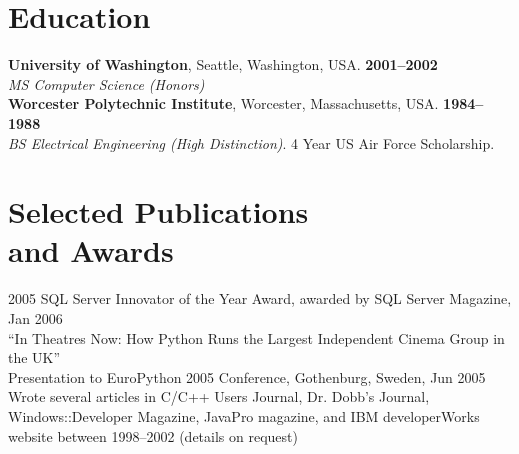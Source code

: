 \documentclass[margin,line]{resume}
\begin{document}
\begin{resume}
    \section{\mysidestyle Education}
	\textbf{University of Washington}, Seattle, Washington, USA. \hfill \textbf{2001--2002}\\
	\textsl{MS Computer Science (Honors)} \\
	\textbf{Worcester Polytechnic Institute}, Worcester, Massachusetts, USA. \hfill \textbf{1984--1988}\\
	\textsl{BS Electrical Engineering (High Distinction)}. 4 Year US Air Force Scholarship. 

    \section{\mysidestyle Selected Publications\\ and Awards} 

	2005 SQL Server Innovator of the Year Award, awarded by SQL Server Magazine, Jan 2006\vspace{1mm}\\%
	``In Theatres Now: How Python Runs the Largest Independent Cinema Group in the UK''\\
	Presentation to EuroPython 2005 Conference, Gothenburg, Sweden, Jun 2005\vspace{1mm}\\
	Wrote several articles in C/C++ Users Journal, Dr. Dobb's Journal, Windows::Developer Magazine,
	JavaPro magazine, and IBM developerWorks website between 1998--2002 (details on request)
	

\end{resume}
\end{document}
